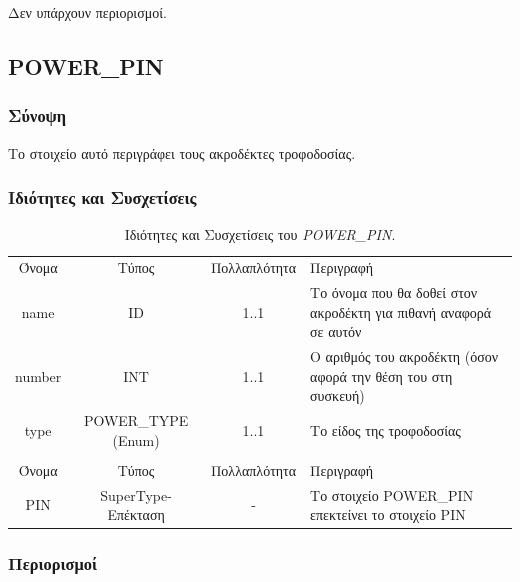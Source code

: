 \noindent Δεν υπάρχουν περιορισμοί.

\subsection{POWER\_PIN}
\label{subsec:power_pin}

\subsubsection*{Σύνοψη}

\noindent Το στοιχείο αυτό περιγράφει τους ακροδέκτες τροφοδοσίας.

\subsubsection*{Ιδιότητες και Συσχετίσεις}

\begin{table}[H]
	\begin{center}
		\begin{tabular}{ | c | c | c| m{5.5cm} | }
			\hline
			\rowcolor{Gray}
			\multicolumn{4}{|c|}{\textbf{Ιδιότητες}}\\
			\hline
			\rowcolor{Gray}
			Όνομα & Τύπος & Πολλαπλότητα & Περιγραφή \\
			\hline
			name & ID & 1..1 & Το όνομα που θα δοθεί στον ακροδέκτη για πιθανή αναφορά σε αυτόν \\
			\hline
			number & INT & 1..1 & Ο αριθμός του ακροδέκτη (όσον αφορά την θέση του στη συσκευή) \\
			\hline
			type & POWER\_TYPE (Enum) & 1..1 & Το είδος της τροφοδοσίας \\
			\hline
			\rowcolor{Gray}
			\multicolumn{4}{|c|}{\textbf{Συσχετίσεις}}\\
			\hline
			\rowcolor{Gray}
			Όνομα & Τύπος & Πολλαπλότητα & Περιγραφή \\
			\hline
			PIN & SuperType-Επέκταση & - &  Το στοιχείο POWER\_PIN επεκτείνει το στοιχείο PIN \\
			\hline
		\end{tabular}
		\caption{Ιδιότητες και Συσχετίσεις του \textit{POWER\_PIN}.}
		\label{tab:power_pin}
	\end{center}
\end{table}

\subsubsection*{Περιορισμοί}

